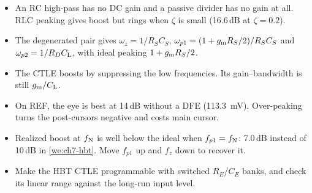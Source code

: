 \begin{takeaways}
\begin{itemize}
  \item An RC high-pass has no DC gain and a passive divider has no gain at all. RLC peaking gives boost but rings when $\zeta$ is small (16.6\,dB at $\zeta=0.2$).
  \item The degenerated pair gives $\omega_z=1/R_SC_S$, $\omega_{p1}=(1+g_\mathrm{m} R_S/2)/R_SC_S$ and $\omega_{p2}=1/R_DC_\mathrm{L}$, with ideal peaking $1+g_\mathrm{m} R_S/2$.
  \item The CTLE boosts by suppressing the low frequencies. Its gain--bandwidth is still $g_\mathrm{m}/C_\mathrm{L}$.
  \item On REF, the eye is best at 14\,dB without a DFE (\qty{113.3}{\milli\volt}). Over-peaking turns the post-cursors negative and costs main cursor.
  \item Realized boost at $f_\mathrm{N}$ is well below the ideal when $f_{p1}=f_\mathrm{N}$: 7.0\,dB instead of 10\,dB in \cref{we:ch7-hbt}. Move $f_{p1}$ up and $f_z$ down to recover it.
  \item Make the HBT CTLE programmable with switched $R_E$/$C_E$ banks, and check its linear range against the long-run input level.
\end{itemize}
\end{takeaways}
